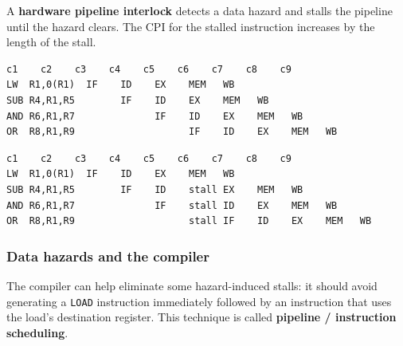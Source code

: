 \begin{definition}
A \textbf{hardware pipeline interlock} detects a data hazard and stalls the
pipeline until the hazard clears. The CPI for the stalled instruction
increases by the length of the stall.
\end{definition}

\begin{lstlisting}[caption={No hazard (ideal)}]
              c1    c2    c3    c4    c5    c6    c7    c8    c9
LW  R1,0(R1)  IF    ID    EX    MEM   WB
SUB R4,R1,R5        IF    ID    EX    MEM   WB
AND R6,R1,R7              IF    ID    EX    MEM   WB
OR  R8,R1,R9                    IF    ID    EX    MEM   WB
\end{lstlisting}
\begin{lstlisting}[caption={Load-use hazard: interlock inserts one stall, then forwards}]
              c1    c2    c3    c4    c5    c6    c7    c8    c9
LW  R1,0(R1)  IF    ID    EX    MEM   WB
SUB R4,R1,R5        IF    ID    stall EX    MEM   WB
AND R6,R1,R7              IF    stall ID    EX    MEM   WB
OR  R8,R1,R9                    stall IF    ID    EX    MEM   WB
\end{lstlisting}

\subsubsection{Data hazards and the compiler}

\begin{definition}
The compiler can help eliminate some hazard-induced stalls: it should avoid
generating a \texttt{LOAD} instruction immediately followed by an
instruction that uses the load's destination register. This technique is
called \textbf{pipeline / instruction scheduling}.
\end{definition}

